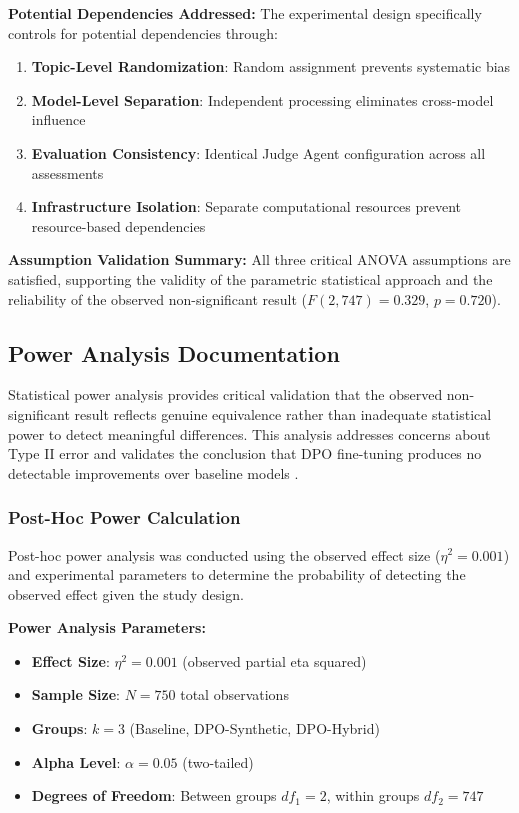 \textbf{Potential Dependencies Addressed:}
The experimental design specifically controls for potential dependencies through:
\begin{enumerate}
    \item \textbf{Topic-Level Randomization}: Random assignment prevents systematic bias
    \item \textbf{Model-Level Separation}: Independent processing eliminates cross-model influence
    \item \textbf{Evaluation Consistency}: Identical Judge Agent configuration across all assessments
    \item \textbf{Infrastructure Isolation}: Separate computational resources prevent resource-based dependencies
\end{enumerate}

\textbf{Assumption Validation Summary:}
All three critical ANOVA assumptions are satisfied, supporting the validity of the parametric statistical approach and the reliability of the observed non-significant result ($F(2,747) = 0.329$, $p = 0.720$).

\subsection{Power Analysis Documentation}
\label{subsec:power-analysis-documentation}

Statistical power analysis provides critical validation that the observed non-significant result reflects genuine equivalence rather than inadequate statistical power to detect meaningful differences. This analysis addresses concerns about Type II error and validates the conclusion that DPO fine-tuning produces no detectable improvements over baseline models \cite{card2020statistical_power}.

\subsubsection{Post-Hoc Power Calculation}

Post-hoc power analysis was conducted using the observed effect size ($\eta^2 = 0.001$) and experimental parameters to determine the probability of detecting the observed effect given the study design.

\textbf{Power Analysis Parameters:}
\begin{itemize}
    \item \textbf{Effect Size}: $\eta^2 = 0.001$ (observed partial eta squared)
    \item \textbf{Sample Size}: $N = 750$ total observations
    \item \textbf{Groups}: $k = 3$ (Baseline, DPO-Synthetic, DPO-Hybrid)
    \item \textbf{Alpha Level}: $\alpha = 0.05$ (two-tailed)
    \item \textbf{Degrees of Freedom}: Between groups $df_1 = 2$, within groups $df_2 = 747$
\end{itemize}

